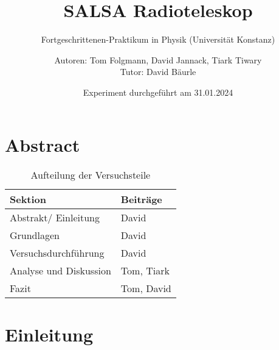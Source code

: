 \documentclass[
    oneside, 
    footinclude=off, 
    captions=tableheading, 
    DIV=12;usenames,
    dvipsnames
]{scrartcl}
\begin{document}
    \title{SALSA Radioteleskop}
    \subtitle{Fortgeschrittenen-Praktikum in Physik (Universität Konstanz)}
    \author{Autoren: Tom Folgmann, David Jannack, Tiark Tiwary \\ \large{Tutor: David Bäurle}}
    \date{Experiment durchgeführt am 31.01.2024}
    \maketitle
    \thispagestyle{empty}
    \section*{Abstract}
        

    \begin{table}[H]
        \centering
        \begin{tabular}{ll}
             Sektion & Beiträge \\\hline\hline
             Abstrakt/ Einleitung & David \\
             Grundlagen & David \\
             Versuchsdurchführung & David \\
             Analyse und Diskussion & Tom, Tiark \\
             Fazit & Tom, David
        \end{tabular}
        \caption{Aufteilung der Versuchsteile}
        \label{tab:Aufteilung}
    \end{table}

    \newpage


    \tableofcontents
    \thispagestyle{empty}	
    \newpage
    \setcounter{page}{1}


\newpage
\section{Einleitung}
        

%    
\end{document}
